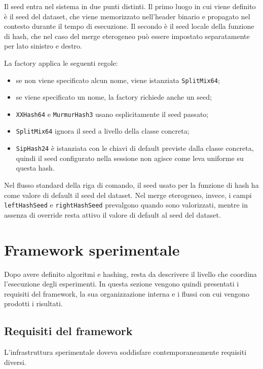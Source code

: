 Il seed entra nel sistema in due punti distinti. Il primo luogo in cui viene definito è il seed del dataset,
che viene memorizzato nell'header binario e propagato nel contesto durante il tempo di esecuzione. Il
secondo è il seed locale della funzione di hash, che nel caso del merge
eterogeneo può essere impostato separatamente per lato sinistro e destro.

La factory  applica le seguenti regole:
\begin{itemize}
    \item se non viene specificato alcun nome, viene istanziata
    \texttt{SplitMix64};
    \item se viene specificato un nome, la factory richiede anche un seed;
    \item \texttt{XXHash64} e \texttt{MurmurHash3} usano esplicitamente il seed
    passato;
    \item \texttt{SplitMix64} ignora il seed a livello della classe concreta;
    \item \texttt{SipHash24} è istanziata con le chiavi di default previste
    dalla classe concreta, quindi il seed configurato nella sessione non agisce
    come leva uniforme su questa hash.
\end{itemize}

Nel flusso standard della riga di comando, il seed usato per la funzione di hash
ha come valore di default il seed del dataset. Nel merge eterogeneo, invece, i campi
\texttt{leftHashSeed} e \texttt{rightHashSeed} prevalgono quando sono
valorizzati, mentre in assenza di override resta attivo il valore di default al seed del
dataset.

\section{Framework sperimentale}

Dopo avere definito algoritmi e hashing, resta da descrivere il livello che
coordina l'esecuzione degli esperimenti. In questa sezione vengono quindi
presentati i requisiti del framework, la sua organizzazione interna e i flussi
con cui vengono prodotti i risultati.

\subsection{Requisiti del framework}

L'infrastruttura sperimentale doveva soddisfare contemporaneamente requisiti
diversi.

